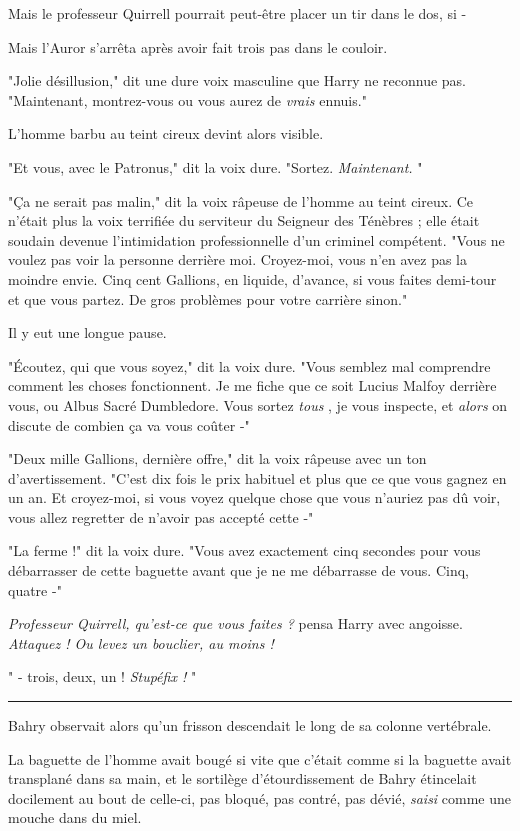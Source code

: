 Mais le professeur Quirrell pourrait peut-être placer un tir dans le dos, si -

Mais l'Auror s'arrêta après avoir fait trois pas dans le couloir.

"Jolie désillusion," dit une dure voix masculine que Harry ne reconnue pas. "Maintenant, montrez-vous ou vous aurez de \emph{vrais}  ennuis."

L'homme barbu au teint cireux devint alors visible.

"Et vous, avec le Patronus," dit la voix dure. "Sortez. \emph{Maintenant.} "

"Ça ne serait pas malin," dit la voix râpeuse de l'homme au teint cireux. Ce n'était plus la voix terrifiée du serviteur du Seigneur des Ténèbres ; elle était soudain devenue l'intimidation professionnelle d'un criminel compétent. "Vous ne voulez pas voir la personne derrière moi. Croyez-moi, vous n'en avez pas la moindre envie. Cinq cent Gallions, en liquide, d'avance, si vous faites demi-tour et que vous partez. De gros problèmes pour votre carrière sinon."

Il y eut une longue pause.

"Écoutez, qui que vous soyez," dit la voix dure. "Vous semblez mal comprendre comment les choses fonctionnent. Je me fiche que ce soit Lucius Malfoy derrière vous, ou Albus Sacré Dumbledore. Vous sortez \emph{tous} , je vous inspecte, et \emph{alors}  on discute de combien ça va vous coûter -"

"Deux mille Gallions, dernière offre," dit la voix râpeuse avec un ton d'avertissement. "C'est dix fois le prix habituel et plus que ce que vous gagnez en un an. Et croyez-moi, si vous voyez quelque chose que vous n'auriez pas dû voir, vous allez regretter de n'avoir pas accepté cette -"

"La ferme !" dit la voix dure. "Vous avez exactement cinq secondes pour vous débarrasser de cette baguette avant que je ne me débarrasse de vous. Cinq, quatre -"

\emph{Professeur Quirrell, qu'est-ce que vous faites ? } pensa Harry avec angoisse. \emph{Attaquez ! Ou levez un bouclier, au moins !} 

" - trois, deux, un ! \emph{Stupéfix !} "
\par\noindent\rule{\textwidth}{0.4pt}
Bahry observait alors qu'un frisson descendait le long de sa colonne vertébrale.

La baguette de l'homme avait bougé si vite que c'était comme si la baguette avait transplané dans sa main, et le sortilège d'étourdissement de Bahry étincelait docilement au bout de celle-ci, pas bloqué, pas contré, pas dévié, \emph{saisi}  comme une mouche dans du miel.

